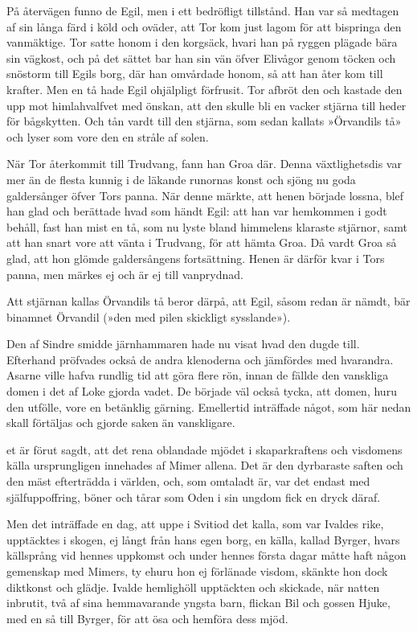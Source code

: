 På återvägen funno de Egil, men i ett bedröfligt tillstånd. Han var så
medtagen af sin långa färd i köld och oväder, att Tor kom just lagom för
att bispringa den vanmäktige. Tor satte honom i den korgsäck, hvari han
på ryggen plägade bära sin vägkost, och på det sättet bar han sin vän
öfver Elivågor genom töcken och snöstorm till Egils borg, där han
omvårdade honom, så att han åter kom till krafter. Men en tå hade Egil
ohjälpligt förfrusit. Tor afbröt den och kastade den upp mot
himlahvalfvet med önskan, att den skulle bli en vacker stjärna till
heder för bågskytten. Och tån vardt till den stjärna, som sedan kallats
»Örvandils tå» och lyser som vore den en stråle af solen.

När Tor återkommit till Trudvang, fann han Groa där. Denna
växtlighetsdis var mer än de flesta kunnig i de läkande runornas konst
och sjöng nu goda galdersånger öfver Tors panna. När denne märkte, att
henen började lossna, blef han glad och berättade hvad som händt Egil:
att han var hemkommen i godt behåll, fast han mist en tå, som nu lyste
bland himmelens klaraste stjärnor, samt att han snart vore att vänta i
Trudvang, för att hämta Groa. Då vardt Groa så glad, att hon glömde
galdersångens fortsättning. Henen är därför kvar i Tors panna, men märkes ej och är ej till vanprydnad.

Att stjärnan kallas Örvandils tå beror därpå, att Egil, såsom redan är
nämdt, bär binamnet Örvandil (»den med pilen skickligt sysslande»).

Den af Sindre smidde järnhammaren hade nu visat hvad den dugde till.
Efterhand pröfvades också de andra klenoderna och jämfördes med
hvarandra. Asarne ville hafva rundlig tid att göra flere rön, innan de
fällde den vanskliga domen i det af Loke gjorda vadet. De började väl
också tycka, att domen, huru den utfölle, vore en betänklig gärning.
Emellertid inträffade något, som här nedan skall förtäljas och gjorde
saken än vanskligare.

\endSecII


\dropcapD et är förut sagdt, att det rena oblandade mjödet i skaparkraftens och
visdomens källa ursprungligen innehades af Mimer allena. Det är den
dyrbaraste saften och den mäst efterträdda i världen, och, som omtaladt
är, var det endast med själfuppoffring, böner och tårar som Oden i sin
ungdom fick en dryck däraf.

Men det inträffade en dag, att uppe i Svitiod det kalla, som var Ivaldes
rike, upptäcktes i skogen, ej långt från hans egen borg, en källa,
kallad Byrger, hvars källsprång vid hennes uppkomst och under hennes
första dagar måtte haft någon gemenskap med Mimers, ty ehuru hon ej
förlänade visdom, skänkte hon dock diktkonst och glädje. Ivalde
hemlighöll upptäckten och skickade, när natten inbrutit, två af sina
hemmavarande yngsta barn, flickan Bil och gossen Hjuke, med en så till
Byrger, för att ösa och hemföra dess mjöd.

